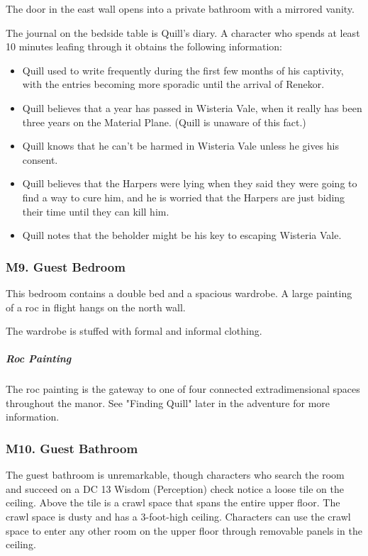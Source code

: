 \documentclass[10pt,a4paper,twoside,bg=print,twocolumn,openany,nodeprecatedcode]{dndbook}
\begin{document}
The door in the east wall opens into a private bathroom with a mirrored vanity.

The journal on the bedside table is Quill's diary. A character who spends at least 10 minutes leafing through it obtains the following information:


\begin{itemize}
\item Quill used to write frequently during the first few months of his captivity, with the entries becoming more sporadic until the arrival of Renekor.
\item Quill believes that a year has passed in Wisteria Vale, when it really has been three years on the Material Plane. (Quill is unaware of this fact.)
\item Quill knows that he can't be harmed in Wisteria Vale unless he gives his consent.
\item Quill believes that the Harpers were lying when they said they were going to find a way to cure him, and he is worried that the Harpers are just biding their time until they can kill him.
\item Quill notes that the beholder might be his key to escaping Wisteria Vale.
\end{itemize}

\subsubsection{M9. Guest Bedroom}
\begin{DndReadAloud}{}
This bedroom contains a double bed and a spacious wardrobe. A large painting of a roc in flight hangs on the north wall.

\end{DndReadAloud}

The wardrobe is stuffed with formal and informal clothing.

\subparagraph{Roc Painting}
The roc painting is the gateway to one of four connected extradimensional spaces throughout the manor. See "Finding Quill" later in the adventure for more information.

\subsubsection{M10. Guest Bathroom}
The guest bathroom is unremarkable, though characters who search the room and succeed on a DC 13 Wisdom (Perception) check notice a loose tile on the ceiling. Above the tile is a crawl space that spans the entire upper floor. The crawl space is dusty and has a 3-foot-high ceiling. Characters can use the crawl space to enter any other room on the upper floor through removable panels in the ceiling.
\end{document}
